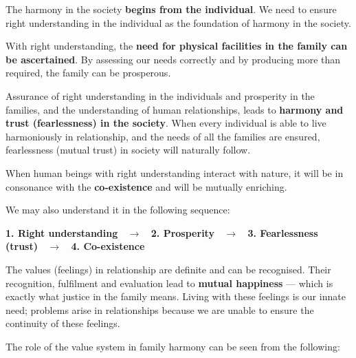 \begin{apts}
\item The harmony in the society \textbf{begins from the individual}. We need
      to ensure right understanding in the individual as the foundation of
      harmony in the society.
\item With right understanding, the \textbf{need for physical facilities in
      the family can be ascertained}. By assessing our needs correctly and by
      producing more than required, the family can be prosperous.
\item Assurance of right understanding in the individuals and prosperity in
      the families, and the understanding of human relationships, leads to
      \textbf{harmony and trust (fearlessness) in the society}. When every
      individual is able to live harmoniously in relationship, and the needs
      of all the families are ensured, fearlessness (mutual trust) in society
      will naturally follow.
\item When human beings with right understanding interact with nature, it will
      be in consonance with the \textbf{co-existence} and will be mutually
      enriching.
\end{apts}

We may also understand it in the following sequence:

\begin{keybox}
\textbf{1. Right understanding \ $\rightarrow$ \ 2. Prosperity \ $\rightarrow$
\ 3. Fearlessness (trust) \ $\rightarrow$ \ 4. Co-existence}
\end{keybox}

%
  {}

\ans The values (feelings) in relationship are definite and can be recognised.
Their recognition, fulfilment and evaluation lead to \textbf{mutual
happiness} --- which is exactly what justice in the family means. Living with
these feelings is our innate need; problems arise in relationships because we
are unable to ensure the continuity of these feelings.

The role of the value system in family harmony can be seen from the following:

